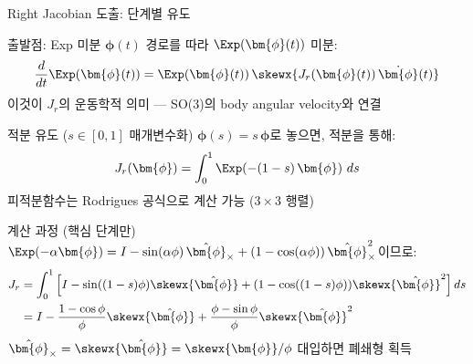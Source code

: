 \begin{frame}[shrink=5]{Right Jacobian 도출: 단계별 유도}
  \begin{block}{출발점: Exp 미분}
    $\bm{\phi}(t)$ 경로를 따라 $\Exp(\bm{\phi}(t))$ 미분:
    \[
      \frac{d}{dt}\Exp(\bm{\phi}(t)) = \Exp(\bm{\phi}(t))\,\skewx{J_r(\bm{\phi}(t))\,\dot{\bm{\phi}}(t)}
    \]
    이것이 $J_r$의 운동학적 의미 --- SO(3)의 body angular velocity와 연결
  \end{block}
  \pause
  \begin{block}{적분 유도 ($s \in [0,1]$ 매개변수화)}
    $\bm{\phi}(s) = s\,\bm{\phi}$로 놓으면, 적분을 통해:
    \[
      J_r(\bm{\phi}) = \int_0^1 \Exp\!\left(-(1-s)\,\bm{\phi}\right)\,ds
    \]
    피적분함수는 Rodrigues 공식으로 계산 가능 ($3\times 3$ 행렬)
  \end{block}
  \pause
  \begin{block}{계산 과정 (핵심 단계만)}
    $\Exp(-\alpha\bm{\phi}) = I - \sin(\alpha\phi)\,\hat{\bm{\phi}}_\times + (1-\cos(\alpha\phi))\,\hat{\bm{\phi}}_\times^2$이므로:
    \begin{align*}
      J_r &= \int_0^1 \left[I - \sin((1-s)\phi)\skewx{\hat{\bm{\phi}}} + (1-\cos((1-s)\phi))\skewx{\hat{\bm{\phi}}}^2\right]ds \\
          &= I - \frac{1-\cos\phi}{\phi}\skewx{\hat{\bm{\phi}}} + \frac{\phi - \sin\phi}{\phi}\skewx{\hat{\bm{\phi}}}^2
    \end{align*}
    $\hat{\bm{\phi}}_\times = \skewx{\hat{\bm{\phi}}} = \skewx{\bm{\phi}}/\phi$ 대입하면 폐쇄형 획득
  \end{block}
\end{frame}


